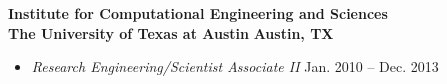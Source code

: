 
\textbf{Institute for Computational Engineering and Sciences}\\
\textbf{The University of Texas at Austin} \hfill \textbf{Austin, TX}
%
\begin{itemize}
\item[] \textit{Research Engineering/Scientist Associate II} \hfill
	Jan. 2010 -- Dec. 2013
\end{itemize}

